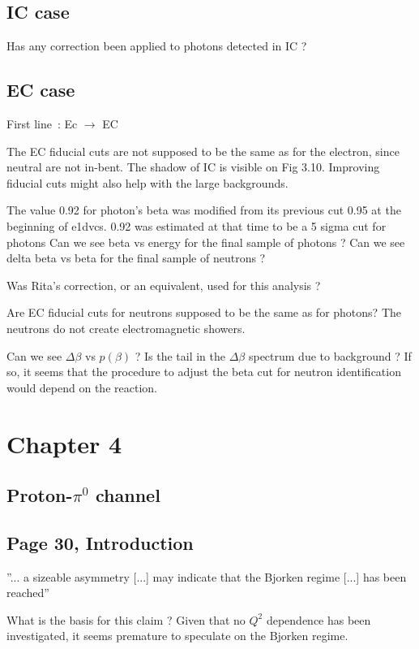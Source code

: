 \documentclass[11pt]{paper}
\begin{document}
\subsection*{IC case}

Has any correction been applied to photons detected in IC ?

\subsection*{EC case}

First line~: Ec $\rightarrow$ EC

The EC fiducial cuts are not supposed to be the same as for the electron, since neutral are not in-bent.
The shadow of IC is visible on Fig 3.10.
Improving fiducial cuts might also help with the large backgrounds.

The value 0.92 for photon's beta was modified from its previous cut 0.95 at the beginning of e1dvcs.
0.92 was estimated at that time to be a 5 sigma cut for photons
Can we see beta vs energy for the final sample of photons ?
Can we see delta beta vs beta for the final sample of neutrons ?

Was Rita's correction, or an equivalent, used for this analysis ?

Are EC fiducial cuts for neutrons supposed to be the same as for photons?
The neutrons do not create electromagnetic showers. 

Can we see $\Delta\beta$ vs $p(\beta)$ ?
Is the tail in the $\Delta\beta$ spectrum due to background ?
If so, it seems that the procedure to adjust the beta cut for neutron identification would depend on the reaction.

\section*{Chapter 4}
\subsection*{Proton-$\pi^0$ channel}

\subsection*{Page 30, Introduction}

''... a sizeable asymmetry [...] may indicate that the Bjorken regime [...] has been reached''

What is the basis for this claim ? Given that no $Q^2$ dependence has been investigated, it seems premature to speculate on the Bjorken regime.
\end{document}

